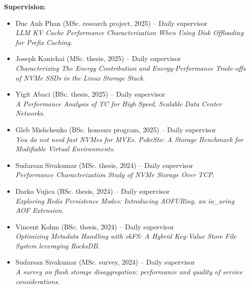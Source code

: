 \documentclass[letterpaper,11pt]{article}
\begin{document}
\textbf{Supervision}:
\begin{itemize}[label={}]
\itemsep0em
  \item Duc Anh Phan (MSc. research project, 2025) -- Daily supervisor\\  
  \textit{LLM KV Cache Performance Characterization When Using Disk Offloading for Prefix Caching}.

  \item Joseph Kanichai  (MSc. thesis, 2025) -- Daily supervisor\\  
  \textit{Characterizing The Energy Contribution and Energy-Performance Trade-offs of NVMe SSDs in the Linux Storage Stack}.

  \item Yigit Abaci  (BSc. thesis, 2025) -- Daily supervisor\\  
  \textit{A Performance Analysis of TC for High Speed, Scalable Data Center Networks}.

  \item Gleb Mishchenko  (BSc. honours program, 2025) -- Daily supervisor\\
  \textit{You do not need fast NVMes for MVEs. PokeSto: A Storage Benchmark for Modifiable Virtual Environments}.
  
  \item Sudarsan Sivakumar (MSc. thesis, 2024) -- Daily supervisor\\ 
  \textit{Performance Characterization Study of NVMe Storage Over TCP}.
  
  \item Darko Vujica (BSc. thesis, 2024) -- Daily supervisor\\ 
  \textit{Exploring Redis Persistence Modes: Introducing AOFURing, an io\_uring AOF Extension}.
  
  \item Vincent Kohm (BSc. thesis, 2024) -- Daily supervisor\\ 
  \textit{Optimizing Metadata Handling with vkFS: A Hybrid Key-Value Store File System leveraging RocksDB}.
  
  \item Sudarsan Sivakumar (MSc. survey, 2024) -- Daily supervisor\\ 
  \textit{A survey on flash storage disaggregation: performance and quality of service considerations}.
\end{itemize}
\end{document}

